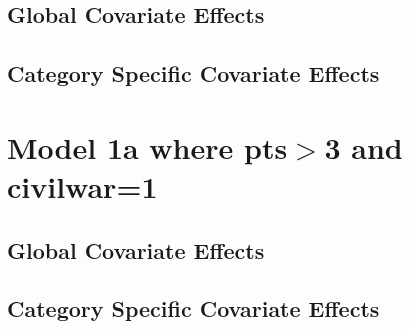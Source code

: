 \documentclass[]{article}
\begin{document}
\subsection{Global Covariate Effects}

\clearpage
\subsection{Category Specific Covariate Effects}

\clearpage


\section{Model 1a where pts$>$3 and civilwar=1}
\subsection{Global Covariate Effects}

\clearpage
\subsection{Category Specific Covariate Effects}

\clearpage
\end{document}
